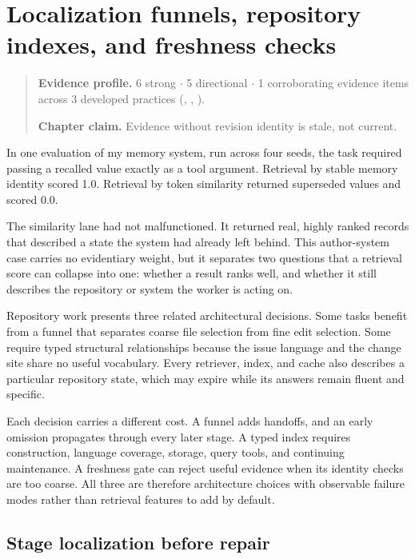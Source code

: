 \chapter{Localization funnels, repository indexes, and freshness checks}
\label{ch13-localization-funnels-repository-indexes-freshness-checks}
\begin{quote}
\textbf{Evidence profile.} 6 strong \(\cdot\) 5 directional \(\cdot\) 1 corroborating evidence items across 3 developed practices (, , ).

\textbf{Chapter claim.} Evidence without revision identity is stale, not current.
\end{quote}

In one evaluation of my memory system, run across four seeds, the task required passing a recalled value exactly as a tool argument. Retrieval by stable memory identity scored 1.0. Retrieval by token similarity returned superseded values and scored 0.0.

The similarity lane had not malfunctioned. It returned real, highly ranked records that described a state the system had already left behind. This author-system case carries no evidentiary weight, but it separates two questions that a retrieval score can collapse into one: whether a result ranks well, and whether it still describes the repository or system the worker is acting on.

Repository work presents three related architectural decisions. Some tasks benefit from a funnel that separates coarse file selection from fine edit selection. Some require typed structural relationships because the issue language and the change site share no useful vocabulary. Every retriever, index, and cache also describes a particular repository state, which may expire while its answers remain fluent and specific.

Each decision carries a different cost. A funnel adds handoffs, and an early omission propagates through every later stage. A typed index requires construction, language coverage, storage, query tools, and continuing maintenance. A freshness gate can reject useful evidence when its identity checks are too coarse. All three are therefore architecture choices with observable failure modes rather than retrieval features to add by default.

\hypertarget{stage-localization-before-repair}{%
\section{Stage localization before repair}\label{stage-localization-before-repair}}

